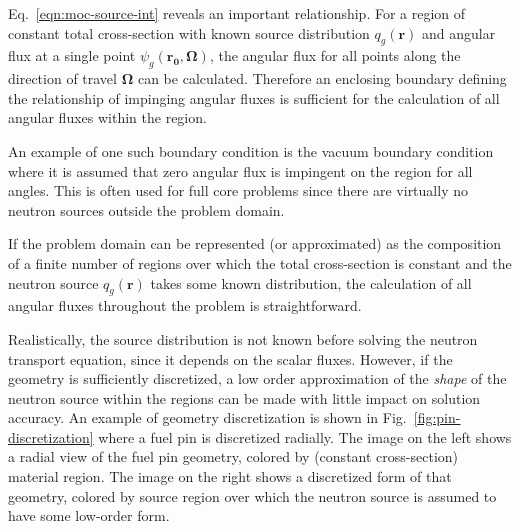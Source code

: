 Eq.~\ref{eqn:moc-source-int} reveals an important relationship. For a region of constant total cross-section with known source distribution $q_g(\mathbf{r})$ and angular flux at a single point $\psi_g(\mathbf{r_0},\mathbf{\Omega})$, the angular flux for all points along the direction of travel $\mathbf{\Omega}$ can be calculated. Therefore an enclosing boundary defining the relationship of impinging angular fluxes is sufficient for the calculation of all angular fluxes within the region.

An example of one such boundary condition is the vacuum boundary condition where it is assumed that zero angular flux is impingent on the region for all angles. This is often used for full core problems since there are virtually no neutron sources outside the problem domain.

If the problem domain can be represented (or approximated) as the composition of a finite number of regions over which the total cross-section is constant and the neutron source $q_g(\mathbf{r})$ takes some known distribution, the calculation of all angular fluxes throughout the problem is straightforward.

Realistically, the source distribution is not known before solving the neutron transport equation, since it depends on the scalar fluxes. However, if the geometry is sufficiently discretized, a low order approximation of the \textit{shape} of the neutron source within the regions can be made with little impact on solution accuracy. An example of geometry discretization is shown in Fig.~\ref{fig:pin-discretization} where a fuel pin is discretized radially. The image on the left shows a radial view of the fuel pin geometry, colored by (constant cross-section) material region. The image on the right shows a discretized form of that geometry, colored by source region over which the neutron source is assumed to have some low-order form.

